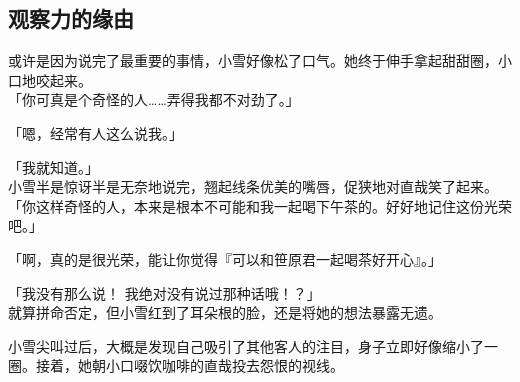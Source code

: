 \subsection{观察力的缘由}

或许是因为说完了最重要的事情，小雪好像松了口气。她终于伸手拿起甜甜圈，小口地咬起来。\\

「你可真是个奇怪的人……弄得我都不对劲了。」

「嗯，经常有人这么说我。」

「我就知道。」\\

小雪半是惊讶半是无奈地说完，翘起线条优美的嘴唇，促狭地对直哉笑了起来。\\

「你这样奇怪的人，本来是根本不可能和我一起喝下午茶的。好好地记住这份光荣吧。」

「啊，真的是很光荣，能让你觉得『可以和笹原君一起喝茶好开心』。」

「我没有那么说！ 我绝对没有说过那种话哦！？」\\

就算拼命否定，但小雪红到了耳朵根的脸，还是将她的想法暴露无遗。

小雪尖叫过后，大概是发现自己吸引了其他客人的注目，身子立即好像缩小了一圈。接着，她朝小口啜饮咖啡的直哉投去怨恨的视线。\\

